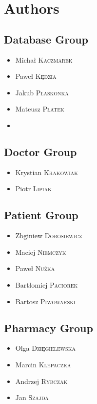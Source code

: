 \documentclass[a4paper,11pt,english]{report}
\begin{document}
\chapter*{Authors}
\begin{minipage}[t]{0.5\textwidth}
\section*{Database Group}
\begin{itemize}
\item[] Michał \textsc{Kaczmarek} 
\item[] Paweł \textsc{Kędzia} 
\item[] Jakub \textsc{Płaskonka} 
\item[] Mateusz \textsc{Płatek} 
\item[] 
\end{itemize}

\section*{Doctor Group}
\begin{itemize}
\item[] Krystian \textsc{Krakowiak}
\item[] Piotr \textsc{Lipiak} 

\end{itemize}

\end{minipage}
\begin{minipage}[t]{0.5\textwidth}

\section*{Patient Group}
\begin{itemize}
\item[] Zbginiew \textsc{Dobosiewicz}
\item[] Maciej \textsc{Niemczyk} 
\item[] Paweł \textsc{Nużka} 
\item[] Bartłomiej \textsc{Paciorek}
\item[] Bartosz \textsc{Piwowarski}
\end{itemize}

\section*{Pharmacy Group}
\begin{itemize}
\item[] Olga \textsc{Dzięgielewska} 
\item[] Marcin \textsc{Klepaczka} 
\item[] Andrzej \textsc{Rybczak} 
\item[] Jan  \textsc{Szajda}
\end{itemize}

\end{minipage}
\end{document}
